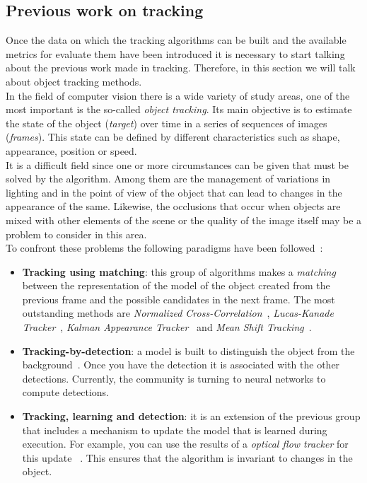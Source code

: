 \subsection{Previous work on tracking}
Once the data on which the tracking algorithms can be built and the available metrics for evaluate them have been introduced it is necessary to start talking about the previous work made in tracking. Therefore, in this section we will talk about object tracking methods.\\
In the field of computer vision there is a wide variety of study areas, one of the most important is the so-called \textit{object tracking}. Its main objective is to estimate the state of the object (\textit{target}) over time in a series of sequences of images (\textit{frames}). This state can be defined by different characteristics such as shape, appearance, position or speed.\\
It is a difficult field since one or more circumstances can be given that must be solved by the algorithm. Among them are the management of variations in lighting and in the point of view of the object that can lead to changes in the appearance of the same. Likewise, the occlusions that occur when objects are mixed with other elements of the scene or the quality of the image itself may be a problem to consider in this area.\\
To confront these problems the following paradigms have been followed~\cite{smeulders2014visual}:
\begin{itemize}
\item \textbf{Tracking using matching}: this group of algorithms makes a \textit {matching} between the representation of the model of the object created from the previous frame and the possible candidates in the next frame. The most outstanding methods are \textit{Normalized Cross-Correlation}~\cite{briechle2001template}, \textit{Lucas-Kanade Tracker}~\cite {baker2004lucas}, \textit{Kalman Appearance Tracker}~\cite{nguyen2004fast} and \textit{Mean Shift Tracking}~\cite{comaniciu2000real}.
\item \textbf{Tracking-by-detection}: a model is built to distinguish the object from the background~\cite{nguyen2006robust}. Once you have the detection it is associated with the other detections. Currently, the community is turning to neural networks to compute detections.
\item \textbf{Tracking, learning and detection}: it is an extension of the previous group that includes a mechanism to update the model that is learned during execution. For example, you can use the results of a \textit{optical flow tracker} for this update ~\cite{kalal2010pn}. This ensures that the algorithm is invariant to changes in the object. 
\end{itemize}
